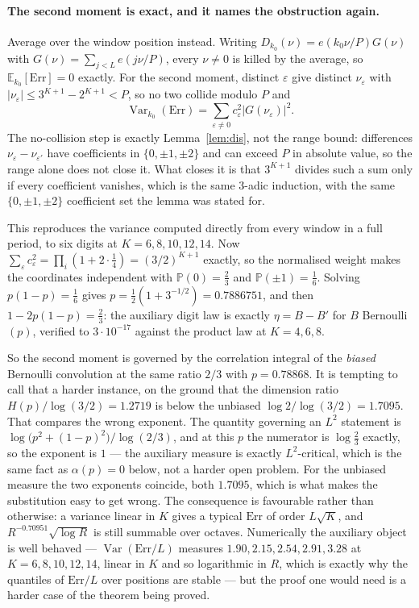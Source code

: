 \documentclass[11pt]{article}
\theoremstyle{remark}
\newcommand{\eps}{\varepsilon}
\begin{document}
\paragraph{The second moment is exact, and it names the obstruction again.} Average over the window
position instead. Writing $D_{k_0}(\nu)=e(k_0\nu/P)G(\nu)$ with $G(\nu)=\sum_{j<L}e(j\nu/P)$, every
$\nu\ne0$ is killed by the average, so $\mathbb E_{k_0}[\mathrm{Err}]=0$ exactly. For the second moment,
distinct $\eps$ give distinct $\nu_\eps$ with $|\nu_\eps|\le3^{K+1}-2^{K+1}<P$, so no two collide
modulo $P$ and
\[
  \operatorname{Var}_{k_0}(\mathrm{Err})=\sum_{\eps\ne0}c_\eps^2|G(\nu_\eps)|^2 .
\]
The no-collision step is exactly Lemma~\ref{lem:dis}, not the range bound: differences $\nu_\eps-
\nu_{\eps'}$ have coefficients in $\{0,\pm1,\pm2\}$ and can exceed $P$ in absolute value, so the range
alone does not close it. What closes it is that $3^{K+1}$ divides such a sum only if every coefficient
vanishes, which is the same $3$-adic induction, with the same $\{0,\pm1,\pm2\}$ coefficient set the
lemma was stated for.

This reproduces the variance computed directly from every window in a full period, to six digits at
$K=6,8,10,12,14$. Now $\sum_\eps c_\eps^2=\prod_i(1+2\cdot\tfrac14)=(3/2)^{K+1}$ exactly, so the
normalised weight makes the coordinates independent with $\mathbb P(0)=\tfrac23$ and
$\mathbb P(\pm1)=\tfrac16$. Solving $p(1-p)=\tfrac16$ gives $p=\tfrac12(1+3^{-1/2})=0.7886751$, and then
$1-2p(1-p)=\tfrac23$: the auxiliary digit law is exactly $\eta=B-B'$ for $B$ Bernoulli$(p)$, verified to
$3\cdot10^{-17}$ against the product law at $K=4,6,8$.

So the second moment is governed by the correlation integral of the \emph{biased} Bernoulli convolution
at the same ratio $2/3$ with $p=0.78868$. It is tempting to call that a harder instance, on the ground
that the dimension ratio $H(p)/\log(3/2)=1.2719$ is below the unbiased $\log2/\log(3/2)=1.7095$. That
compares the wrong exponent. The quantity governing an $L^2$ statement is
$\log\bigl(p^2+(1-p)^2\bigr)/\log(2/3)$, and at this $p$ the numerator is $\log\tfrac23$ exactly, so the
exponent is $1$ --- the auxiliary measure is exactly $L^2$-critical, which is the same fact as
$\alpha(p)=0$ below, not a harder open problem. For the unbiased measure the two exponents coincide,
both $1.7095$, which is what makes the substitution easy to get wrong. The consequence is favourable
rather than otherwise: a variance linear in $K$ gives a typical $\mathrm{Err}$ of order $L\sqrt K$, and
$R^{-0.70951}\sqrt{\log R}$ is still summable over octaves. Numerically the auxiliary object is well behaved
--- $\operatorname{Var}(\mathrm{Err}/L)$ measures $1.90,2.15,2.54,2.91,3.28$ at $K=6,8,10,12,14$, linear
in $K$ and so logarithmic in $R$, which is exactly why the quantiles of $\mathrm{Err}/L$ over positions
are stable --- but the proof one would need is a harder case of the theorem being proved.
\end{document}
